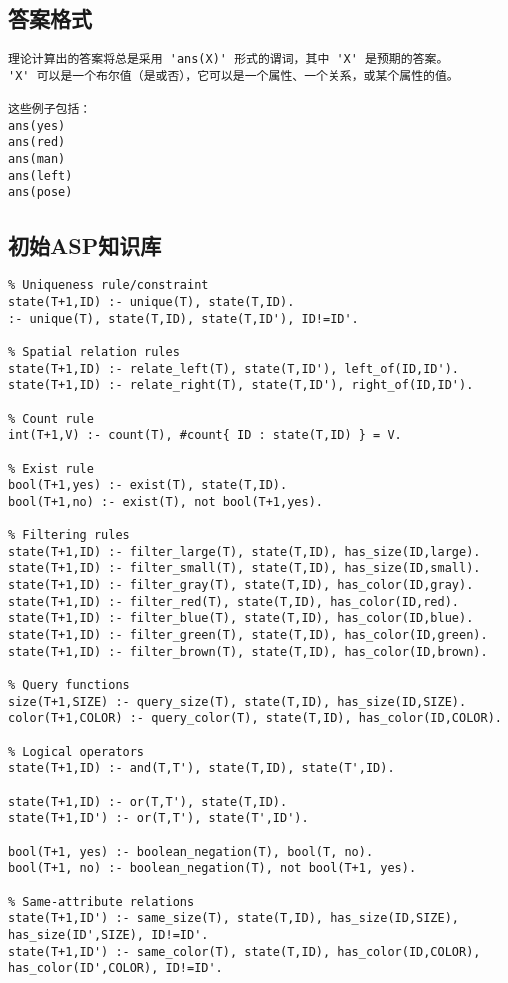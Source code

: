 \subsection{答案格式}
\begin{lstlisting}
理论计算出的答案将总是采用 'ans(X)' 形式的谓词，其中 'X' 是预期的答案。
'X' 可以是一个布尔值（是或否），它可以是一个属性、一个关系，或某个属性的值。

这些例子包括：
ans(yes)
ans(red)
ans(man)
ans(left)
ans(pose)
\end{lstlisting}
\subsection{初始ASP知识库}
\label{appendix:initial-theory}
\begin{lstlisting}
% Uniqueness rule/constraint
state(T+1,ID) :- unique(T), state(T,ID).
:- unique(T), state(T,ID), state(T,ID'), ID!=ID'.

% Spatial relation rules
state(T+1,ID) :- relate_left(T), state(T,ID'), left_of(ID,ID').
state(T+1,ID) :- relate_right(T), state(T,ID'), right_of(ID,ID').

% Count rule
int(T+1,V) :- count(T), #count{ ID : state(T,ID) } = V.

% Exist rule
bool(T+1,yes) :- exist(T), state(T,ID).
bool(T+1,no) :- exist(T), not bool(T+1,yes).

% Filtering rules
state(T+1,ID) :- filter_large(T), state(T,ID), has_size(ID,large).
state(T+1,ID) :- filter_small(T), state(T,ID), has_size(ID,small).
state(T+1,ID) :- filter_gray(T), state(T,ID), has_color(ID,gray).
state(T+1,ID) :- filter_red(T), state(T,ID), has_color(ID,red).
state(T+1,ID) :- filter_blue(T), state(T,ID), has_color(ID,blue).
state(T+1,ID) :- filter_green(T), state(T,ID), has_color(ID,green).
state(T+1,ID) :- filter_brown(T), state(T,ID), has_color(ID,brown).

% Query functions
size(T+1,SIZE) :- query_size(T), state(T,ID), has_size(ID,SIZE).
color(T+1,COLOR) :- query_color(T), state(T,ID), has_color(ID,COLOR).

% Logical operators
state(T+1,ID) :- and(T,T'), state(T,ID), state(T',ID).

state(T+1,ID) :- or(T,T'), state(T,ID).
state(T+1,ID') :- or(T,T'), state(T',ID').

bool(T+1, yes) :- boolean_negation(T), bool(T, no).
bool(T+1, no) :- boolean_negation(T), not bool(T+1, yes).

% Same-attribute relations
state(T+1,ID') :- same_size(T), state(T,ID), has_size(ID,SIZE), has_size(ID',SIZE), ID!=ID'.
state(T+1,ID') :- same_color(T), state(T,ID), has_color(ID,COLOR), has_color(ID',COLOR), ID!=ID'.


\end{lstlisting}
